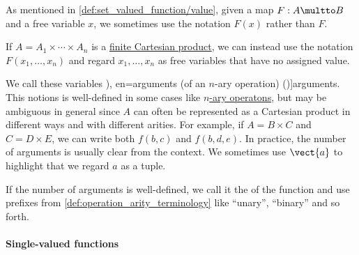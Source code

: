 \begin{concept}\label{con:function_arguments}
  As mentioned in \cref{def:set_valued_function/value}, given a map \( F: A \multto B \) and a free variable \( x \), we sometimes use the notation \( F(x) \) rather than \( F \).

  If \( A = A_1 \times \cdots \times A_n \) is a \hyperref[def:cartesian_product]{finite Cartesian product}, we can instead use the notation \( F(x_1, \ldots, x_n) \) and regard \( x_1, \ldots, x_n \) as free variables that have no assigned value.

  We call these variables \term[ru=аргументы (\( n \)-местной операции) (\cite[def. 2.1]{БелоусовТкачёв2004ДискретнаяМатематика}), en=arguments (of an \( n \)-ary operation) (\cite[xxii]{Mendelson2015Logic})]{arguments}. This notions is well-defined in some cases like \hyperref[def:operation_on_set]{\( n \)-ary operatons}, but may be ambiguous in general since \( A \) can often be represented as a Cartesian product in different ways and with different arities. For example, if \( A = B \times C \) and \( C = D \times E \), we can write both \( f(b, c) \) and \( f(b, d, e) \). In practice, the number of arguments is usually clear from the context. We sometimes use \( \vect{a} \) to highlight that we regard \( a \) as a tuple.

  If the number of arguments is well-defined, we call it the  of the function and use prefixes from \cref{def:operation_arity_terminology} like \enquote{unary}, \enquote{binary} and so forth.
\end{concept}

\paragraph{Single-valued functions}

